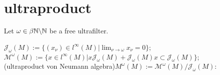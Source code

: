 
      
\section{ultraproduct}

Let $\omega \in \beta \mathbb{N} \backslash \mathbb{N}$ be a free ultrafilter.

\begin{definition}
  $\mathcal{J}_\omega(M) := \{(x_\nu) \in l^\infty(M) | \lim_{\nu \rightarrow \omega}x_\nu = 0\}$;\\
  $\mathcal{M}^\omega(M) := \{x \in l^\infty(M) | x\mathcal{J}_\omega(M) + \mathcal{J}_\omega(M)x \subset \mathcal{J}_\omega(M)\}$;\\
  (ultraproduct von Neumann algebra)$M^\omega(M) := \mathcal{M}^\omega(M)/\mathcal{J}_\omega(M)$:
\end{definition}

